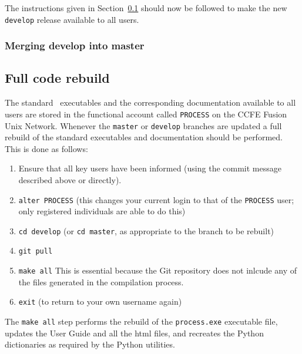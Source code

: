 The instructions given in Section~\ref{sec:fullrebuild} should now be followed to make the new \texttt{develop} release available to all users.

\subsubsection{Merging develop into master}


\subsection{Full code rebuild}
\label{sec:fullrebuild}

The standard \process\ executables and the corresponding documentation
available to all users are stored in the functional account called
\texttt{PROCESS} on the CCFE Fusion Unix Network. Whenever the \texttt{master}
or \texttt{develop} branches are updated a full rebuild of the standard
executables and documentation should be performed. This is done as follows:
\begin{enumerate}

\item Ensure that all key users have been informed (using the commit message described above or directly).

\item \texttt{alter PROCESS}  (this changes your current login to that of the
  \texttt{PROCESS} user; only registered individuals are able to do this)

\item \texttt{cd develop}  (or \texttt{cd master}, as appropriate to the
  branch to be rebuilt)

\item \texttt{git pull}

\item \texttt{make all}
This is essential because the Git repository does not inlcude any of the files generated in the compilation process.

\item \texttt{exit}  (to return to your own username again)

\end{enumerate}

The \texttt{make all} step performs the rebuild of the \texttt{process.exe} executable
file, updates the User Guide and all the html files, and recreates the Python
dictionaries as required by the Python utilities.
